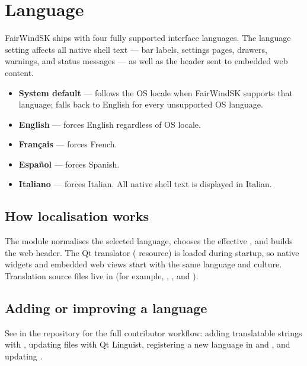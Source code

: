 \section{Language}

FairWindSK ships with four fully supported interface languages.
The language setting affects all native shell text --- bar labels, settings pages,
drawers, warnings, and status messages --- as well as the 
header sent to embedded web content.

\begin{itemize}
  \item \textbf{System default} --- follows the OS locale when FairWindSK supports
        that language; falls back to English for every unsupported OS language.
  \item \textbf{English} --- forces English regardless of OS locale.
  \item \textbf{Français} --- forces French.
  \item \textbf{Español} --- forces Spanish.
  \item \textbf{Italiano} --- forces Italian. All native shell text is displayed in Italian.
\end{itemize}

\subsection{How localisation works}

The  module normalises the selected language, chooses the
effective , and builds the web  header.
The Qt translator ( resource) is loaded during startup, so native widgets
and embedded web views start with the same language and culture.
Translation source files live in  (for example,
, , and
).

\subsection{Adding or improving a language}

See  in the repository for the full contributor workflow:
adding translatable strings with , updating  files with
Qt Linguist, registering a new language in  and
, and updating .


